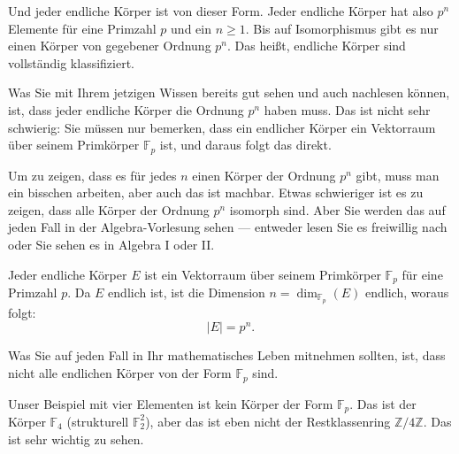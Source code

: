\begin{spoken-clean}[01:08:19 - 01:11:09]
Und jeder endliche Körper ist von dieser Form. Jeder endliche Körper hat also $p^n$ Elemente für eine Primzahl $p$ und ein $n \ge 1$. Bis auf Isomorphismus gibt es nur einen Körper von gegebener Ordnung $p^n$. Das heißt, endliche Körper sind vollständig klassifiziert.

Was Sie mit Ihrem jetzigen Wissen bereits gut sehen und auch nachlesen können, ist, dass jeder endliche Körper die Ordnung $p^n$ haben muss. Das ist nicht sehr schwierig: Sie müssen nur bemerken, dass ein endlicher Körper ein Vektorraum über seinem Primkörper $\mathbb{F}_p$ ist, und daraus folgt das direkt.

Um zu zeigen, dass es für jedes $n$ einen Körper der Ordnung $p^n$ gibt, muss man ein bisschen arbeiten, aber auch das ist machbar. Etwas schwieriger ist es zu zeigen, dass alle Körper der Ordnung $p^n$ isomorph sind. Aber Sie werden das auf jeden Fall in der Algebra-Vorlesung sehen --- entweder lesen Sie es freiwillig nach oder Sie sehen es in Algebra I oder II.
\end{spoken-clean}

\begin{math-stroke}
Jeder endliche Körper $E$ ist ein Vektorraum über seinem Primkörper $\mathbb{F}_p$ für eine Primzahl $p$. Da $E$ endlich ist, ist die Dimension $n = \dim_{\mathbb{F}_p}(E)$ endlich, woraus folgt:
\[
|E| = p^n.
\]
\end{math-stroke}

\begin{spoken-clean}[01:11:09 - 01:12:58]
Was Sie auf jeden Fall in Ihr mathematisches Leben mitnehmen sollten, ist, dass nicht alle endlichen Körper von der Form $\mathbb{F}_p$ sind.

Unser Beispiel mit vier Elementen ist kein Körper der Form $\mathbb{F}_p$. Das ist der Körper $\mathbb{F}_4$ (strukturell $\mathbb{F}_2^2$), aber das ist eben nicht der Restklassenring $\mathbb{Z}/4\mathbb{Z}$. Das ist sehr wichtig zu sehen.
\end{spoken-clean}

\begin{math-stroke}
\end{math-stroke}

